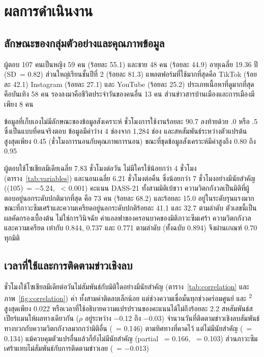 \section{ผลการดำเนินงาน}

\subsection{ลักษณะของกลุ่มตัวอย่างและคุณภาพข้อมูล}

ผู้ตอบ 107 คนเป็นหญิง 59 คน (ร้อยละ 55.1) และชาย 48 คน (ร้อยละ 44.9)
อายุเฉลี่ย 19.36 ปี (SD~= 0.82) ส่วนใหญ่เรียนชั้นปีที่ 2 (ร้อยละ 81.3)
แพลตฟอร์มที่ใช้มากที่สุดคือ TikTok (ร้อยละ 42.1) Instagram (ร้อยละ 27.1)
และ YouTube (ร้อยละ 25.2)
ประเภทเนื้อหาที่ดูมากที่สุดคือบันเทิง 58 คน รองลงมาคือชีวิตประจำวันของคนอื่น 13 คน
ส่วนข่าวสารบ้านเมืองและการเมืองมีเพียง 8 คน

ข้อมูลที่เก็บเองไม่มีลักษณะของข้อมูลสังเคราะห์
ชั่วโมงการใช้งานร้อยละ 90.7 ลงท้ายด้วย .0 หรือ .5 ซึ่งเป็นแบบที่คนจริงตอบ
ข้อมูลมีค่าว่าง 4 ช่องจาก 1,284 ช่อง
และสหสัมพันธ์ระหว่างตัวแปรต้นสูงสุดเพียง 0.45 (ชั่วโมงการนอนกับคุณภาพการนอน)
ขณะที่ชุดข้อมูลสังเคราะห์มีค่าสูงถึง 0.80 ถึง 0.95

ผู้ตอบใช้โซเชียลมีเดียเฉลี่ย 7.83 ชั่วโมงต่อวัน ไม่มีใครใช้น้อยกว่า 4 ชั่วโมง
(ตาราง~\ref{tab:variables}) และนอนเฉลี่ย 6.21 ชั่วโมงต่อคืน
ซึ่งน้อยกว่า 7 ชั่วโมงอย่างมีนัยสำคัญ ((105)~= −5.24, ~< 0.001)
คะแนน DASS-21 ทั้งสามมิติเบ้ขวา ความวิตกกังวลเป็นมิติที่ผู้ตอบอยู่นอกระดับปกติมากที่สุด
คือ 73 คน (ร้อยละ 68.2) และร้อยละ 15.0 อยู่ในระดับรุนแรงมาก
ขณะที่ภาวะซึมเศร้าและความเครียดอยู่นอกระดับปกติร้อยละ 41.1 และ 32.7 ตามลำดับ
ตัวเลขนี้เป็นผลคัดกรองเบื้องต้น ไม่ใช่การวินิจฉัย
ค่าแอลฟาของครอนบาคของมิติภาวะซึมเศร้า ความวิตกกังวล และความเครียด
เท่ากับ 0.844, 0.737 และ 0.771 ตามลำดับ (ทั้งฉบับ 0.894) จึงผ่านเกณฑ์ 0.70 ทุกมิติ

\subsection{เวลาที่ใช้และการติดตามข่าวเชิงลบ}

ชั่วโมงใช้โซเชียลมีเดียต่อวันไม่สัมพันธ์กับมิติใดอย่างมีนัยสำคัญ
(ตาราง~\ref{tab:correlation} และภาพ~\ref{fig:correlation})
ค่า  ทั้งสามค่าติดลบเล็กน้อย แต่ช่วงความเชื่อมั่นทุกช่วงคร่อมศูนย์
และ \textsuperscript{2} สูงสุดเพียง 0.022
หรือเวลาที่ใช้อธิบายความแปรปรวนของคะแนนได้ไม่ถึงร้อยละ 2.2
สหสัมพันธ์สเปียร์แมนให้ผลทางเดียวกัน ($\rho$ อยู่ระหว่าง −0.12 ถึง −0.03)
จำนวนวันที่ติดตามข่าวเชิงลบสัมพันธ์ทางบวกกับความวิตกกังวลมากกว่ามิติอื่น (~= 0.146)
ตามทิศทางที่คาดไว้ แต่ไม่มีนัยสำคัญ (~= 0.134)
แม้ควบคุมตัวแปรอื่นแล้วก็ยังไม่มีนัยสำคัญ (partial ~= 0.166, ~= 0.103)
ส่วนภาวะซึมเศร้าแทบไม่สัมพันธ์กับการติดตามข่าวเลย (~= −0.013)

